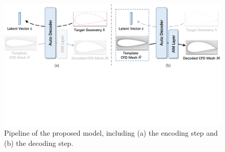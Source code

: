
\begin{figure}[b]
    \centering
    \includegraphics[width=0.97\linewidth]{chapter3/tex/figures/pipeline.pdf}
    \caption{\small Pipeline of the proposed model, including (a) the encoding step and (b) the decoding step.}
    \label{ch3:fig:arch}
\end{figure}
